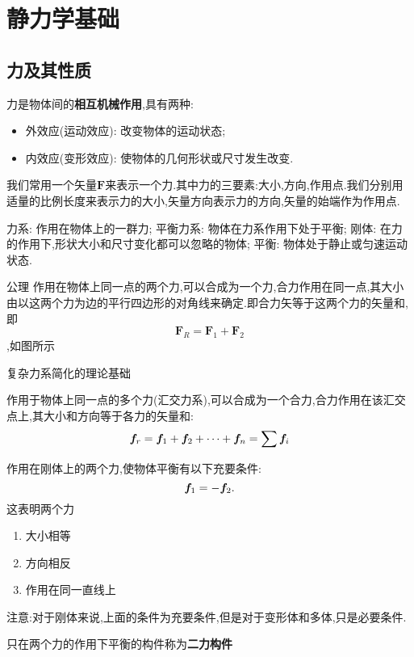 \section{静力学基础}
\subsection{力及其性质}
\begin{definition}[力的定义]
    力是物体间的\textbf{相互机械作用},具有两种:
    \begin{itemize}
        \item 外效应(运动效应): 改变物体的运动状态;
        \item 内效应(变形效应): 使物体的几何形状或尺寸发生改变.
    \end{itemize}
\end{definition}
\begin{definition}[力的三要素]
    我们常用一个矢量$\bm F$来表示一个力.其中力的三要素:大小,方向,作用点.我们分别用适量的比例长度来表示力的大小,矢量方向表示力的方向,矢量的始端作为作用点.
\end{definition}
\begin{definition}[力系的概念]
    力系: 作用在物体上的一群力;
    平衡力系: 物体在力系作用下处于平衡;
    刚体: 在力的作用下,形状大小和尺寸变化都可以忽略的物体;
    平衡: 物体处于静止或匀速运动状态.
\end{definition}

\begin{theorem}公理
    作用在物体上同一点的两个力,可以合成为一个力,合力作用在同一点,其大小由以这两个力为边的平行四边形的对角线来确定.即合力矢等于这两个力的矢量和,即\[\bm{F}_R=\bm{F}_1+\bm{F}_2\],如图所示


    复杂力系简化的理论基础
\end{theorem}
\begin{inference}[力的多边形法则]
    作用于物体上同一点的多个力(汇交力系),可以合成为一个合力,合力作用在该汇交点上,其大小和方向等于各力的矢量和:
    \[\bm f_r=\bm f_1+\bm f_2+\cdots+\bm f_n=\sum \bm f_i\]

\end{inference}

\begin{theorem}[二力平衡条件]
    作用在刚体上的两个力,使物体平衡有以下充要条件:\[\bm f_1=-\bm f_2.\]这表明两个力
    \begin{enumerate}
        \item 大小相等
        \item 方向相反
        \item 作用在同一直线上
    \end{enumerate}
    注意:对于刚体来说,上面的条件为充要条件,但是对于变形体和多体,只是必要条件.
\end{theorem}
\begin{definition}[二力构件]
    只在两个力的作用下平衡的构件称为\textbf{二力构件}
\end{definition}


